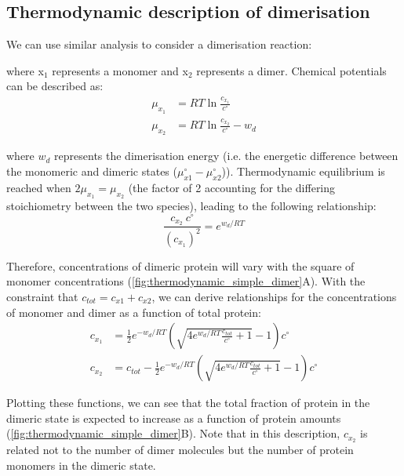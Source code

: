 \documentclass[12pt]{"report"}
\begin{document}
\subsection{Thermodynamic description of dimerisation}
\label{section:thermodynamic_dimerisation}

We can use similar analysis to consider a dimerisation reaction:

\begin{center}
\end{center}

where x$_1$ represents a monomer and x$_2$ represents a dimer. Chemical potentials can be described as:
\begin{align}
\mu_{x_1} &= RT\ln \frac{c_{x_1}}{c^{\circ}} \\
\mu_{x_2} &= RT\ln  \frac{c_{x_2}}{c^{\circ}} - w_d
\end{align} 

where $w_d$ represents the dimerisation energy (i.e. the energetic difference between the monomeric and dimeric states ($\mu_{x1}^{\circ} - \mu_{x2}^{\circ}$)). Thermodynamic equilibrium is reached when $2\mu_{x_1} = \mu_{x_2}$ (the factor of 2 accounting for the differing stoichiometry between the two species), leading to the following relationship:
\begin{equation}
\frac{c_{x_2}\:c^{\circ}}{(c_{x_1})^2} = e^{w_d/RT}
\end{equation}

Therefore, concentrations of dimeric protein will vary with the square of monomer concentrations (\cref{fig:thermodynamic_simple_dimer}A). With the constraint that $c_{tot} = c_{x1} + c_{x2}$, we can derive relationships for the concentrations of monomer and dimer as a function of total protein:
\begin{align}
c_{x_1} &= \frac{1}{2}e^{-w_d/RT}\left(\sqrt{4e^{w_d/RT} \frac{c_{tot}}{c^{\circ}} + 1} - 1\right)c^{\circ}\\
c_{x_2} &= c_{tot} - \frac{1}{2}e^{-w_d/RT}\left(\sqrt{4e^{w_d/RT} \frac{c_{tot}}{c^{\circ}} + 1} - 1\right)c^{\circ}
\end{align}

Plotting these functions, we can see that the total fraction of protein in the dimeric state is expected to increase as a function of protein amounts (\cref{fig:thermodynamic_simple_dimer}B). Note that in this description, $c_{x_2}$ is related not to the number of dimer molecules but the number of protein monomers in the dimeric state.\\
\end{document}

